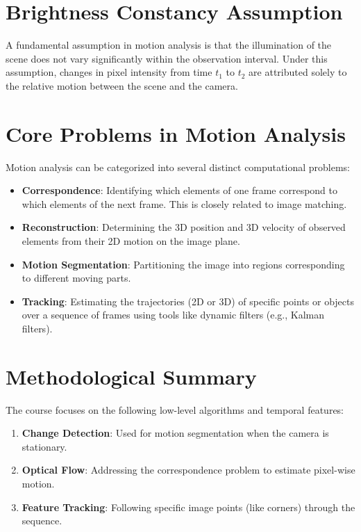 \documentclass{report}
\begin{document}
\section{Brightness Constancy Assumption}
A fundamental assumption in motion analysis is that the illumination of the scene does not vary significantly within the observation interval. Under this assumption, changes in pixel intensity from time $t_1$ to $t_2$ are attributed solely to the relative motion between the scene and the camera.

\section{Core Problems in Motion Analysis}
Motion analysis can be categorized into several distinct computational problems:

\begin{itemize}
    \item \textbf{Correspondence}: Identifying which elements of one frame correspond to which elements of the next frame. This is closely related to image matching.
    \item \textbf{Reconstruction}: Determining the 3D position and 3D velocity of observed elements from their 2D motion on the image plane.
    \item \textbf{Motion Segmentation}: Partitioning the image into regions corresponding to different moving parts.
    \item \textbf{Tracking}: Estimating the trajectories (2D or 3D) of specific points or objects over a sequence of frames using tools like dynamic filters (e.g., Kalman filters).
\end{itemize}

\section{Methodological Summary}
The course focuses on the following low-level algorithms and temporal features:
\begin{enumerate}
    \item \textbf{Change Detection}: Used for motion segmentation when the camera is stationary.
    \item \textbf{Optical Flow}: Addressing the correspondence problem to estimate pixel-wise motion.
    \item \textbf{Feature Tracking}: Following specific image points (like corners) through the sequence.
\end{enumerate}
\end{document}
